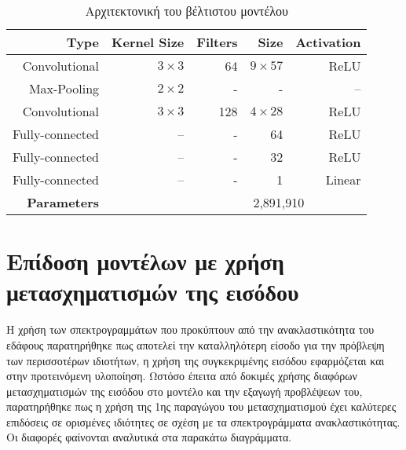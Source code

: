 \begin{table}[H]
    \centering
    \caption{Αρχιτεκτονική του βέλτιστου μοντέλου}
    \label{fig:best_model}
    \begin{tabular}{@{}rrrrr@{}}\toprule
        Type&Kernel Size&Filters&Size&Activation\\
        \midrule
        Convolutional&$3 \times 3$&64&$9 \times 57$&ReLU\\
        Max-Pooling&$2 \times 2$&-&-&–\\
        Convolutional&$3 \times 3$&128&$4 \times 28$&ReLU\\
        Fully-connected&–&-&64&ReLU\\
        Fully-connected&–&-&32&ReLU\\
        Fully-connected&–&-&1&Linear\\
        \hline
        \textbf{Parameters}&&\multicolumn{3}{c}{2,891,910}\\
        \bottomrule
    \end{tabular}
\end{table}

\section{Επίδοση μοντέλων με χρήση μετασχηματισμών της εισόδου }
\label{sec:refl-abs_sg1}
Η χρήση των σπεκτρογραμμάτων που προκύπτουν από την ανακλαστικότητα  του εδάφους παρατηρήθηκε πως αποτελεί την καταλληλότερη είσοδο για την πρόβλεψη των περισσοτέρων ιδιοτήτων, η χρήση της συγκεκριμένης εισόδου  εφαρμόζεται και στην προτεινόμενη υλοποίηση. Ωστόσο έπειτα από δοκιμές χρήσης διαφόρων μετασχηματισμών της εισόδου στο μοντέλο και την εξαγωγή προβλέψεων του, παρατηρήθηκε πως η χρήση της 1ης παραγώγου του μετασχηματισμού  έχει καλύτερες επιδόσεις σε ορισμένες ιδιότητες σε σχέση με τα σπεκτρογράμματα ανακλαστικότητας. Οι διαφορές φαίνονται αναλυτικά στα παρακάτω διαγράμματα.

